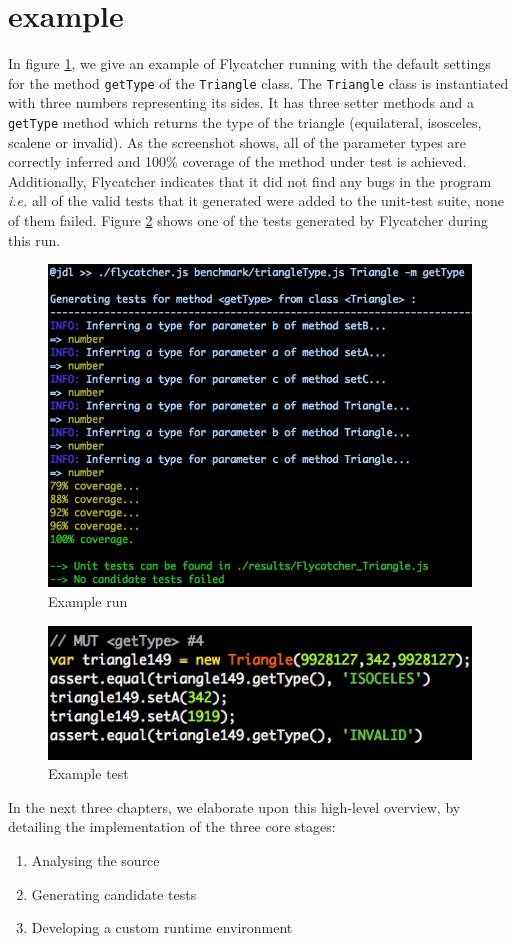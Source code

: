 \section{\textsf{} example}
In figure \ref{run}, we give an example of \textsf{Flycatcher} running with the default settings for the method \texttt{getType} of the \texttt{Triangle} class. The \texttt{Triangle} class is instantiated with three numbers representing its sides. It has three setter methods and a \texttt{getType} method which returns the type of the triangle (equilateral, isosceles, scalene or invalid). As the screenshot shows, all of the parameter types are correctly inferred and 100\% coverage of the method under test is achieved. Additionally, \textsf{Flycatcher} indicates that it did not find any bugs in the program \emph{i.e.} all of the valid tests that it generated were added to the unit-test suite, none of them failed. Figure \ref{testexample} shows one of the tests generated by \textsf{Flycatcher} during this run.\\

\begin{figure}[h]
\hspace*{-0.2cm}
\includegraphics[scale=0.6]{./components/chapter3/run.png}
\caption{Example run}
\label{run}
\end{figure}

\begin{figure}[h]
\centering
\includegraphics[scale=0.6]{./components/chapter3/testexample.png}
\caption{Example test}
\label{testexample}
\end{figure}

In the next three chapters, we elaborate upon this high-level overview, by detailing the implementation of the three core stages:

\begin{enumerate}
   \item Analysing the source
   \item Generating candidate tests
   \item Developing a custom runtime environment
\end{enumerate}